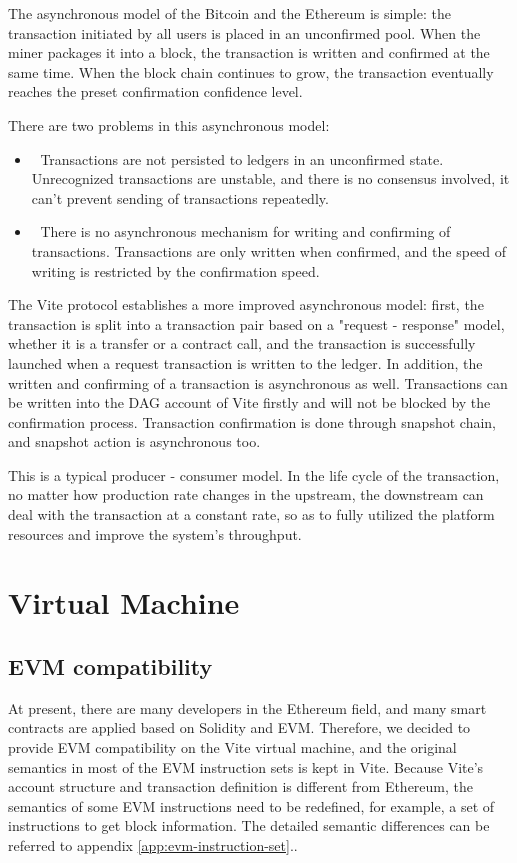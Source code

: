 \documentclass[UTF8,nofonts]{article}
\begin{document}
\begin{multicols}{2}
The asynchronous model of the Bitcoin and the Ethereum is simple: the transaction initiated by all users is placed in an unconfirmed pool. When the miner packages it into a block, the transaction is written and confirmed at the same time. When the block chain continues to grow, the transaction eventually reaches the preset confirmation confidence level.

There are two problems in this asynchronous model:
\begin{itemize}
	\item 	Transactions are not persisted to ledgers in an unconfirmed state. Unrecognized transactions are unstable, and there is no consensus involved, it can’t prevent sending of transactions repeatedly.
	\item 	There is no asynchronous mechanism for writing and confirming of transactions. Transactions are only written when confirmed, and the speed of writing is restricted by the confirmation speed.
\end{itemize}

The Vite protocol establishes a more improved asynchronous model: first, the transaction is split into a transaction pair based on a "request - response" model, whether it is a transfer or a contract call, and the transaction is successfully launched when a request transaction is written to the ledger. In addition, the  written and confirming of a transaction is asynchronous as well. Transactions can be written into the DAG account of Vite firstly and will not be blocked by the confirmation process. Transaction confirmation is done through snapshot chain, and snapshot action is asynchronous too.

This is a typical producer - consumer model. In the life cycle of the transaction, no matter how production rate changes in the upstream, the downstream can deal with the transaction at a constant rate, so as to fully utilized the platform resources and improve the system's throughput.

\section{Virtual Machine}
\subsection{EVM compatibility}
At present, there are many developers in the Ethereum field, and many smart contracts are applied based on Solidity and EVM. Therefore, we decided to provide EVM compatibility on the Vite virtual machine, and the original semantics in most of the EVM instruction sets is kept in Vite. Because Vite's account structure and transaction definition is different from Ethereum, the semantics of some EVM instructions need to be redefined, for example, a set of instructions to get block information. The detailed semantic differences can be referred to appendix \ref{app:evm-instruction-set}..


\end{multicols}
\end{document}
